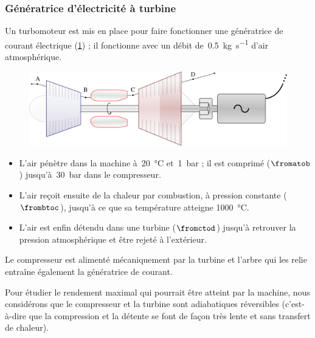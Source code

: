 \subsubsection{Génératrice d’électricité à turbine}
\label{exo_generatrice_electricite_turbine}

	Un turbomoteur est mis en place pour faire fonctionner une génératrice de courant électrique (\cref{fig_exo_turbomoteur}) ; il fonctionne avec un débit de~\SI{0,5}{\kilogram\per\second} d’air atmosphérique.
	
	\begin{figure}
		\begin{center}
		\includegraphics[width=\textwidth]{images/turbomoteur_generatrice.png}
		\end{center}
		\label{fig_exo_turbomoteur}
	\end{figure}
		
	\begin{itemize}
		\item L’air pénètre dans la machine à~\SI{20}{\degreeCelsius} et~\SI{1}{\bar} ; il est comprimé ($\fromatob$) jusqu’à~\SI{30}{\bar} dans le compresseur.	
		\item L’air reçoit ensuite de la chaleur par combustion, à pression constante ($\frombtoc$), jusqu’à ce que sa température atteigne \SI{1000}{\degreeCelsius}.	
		\item L’air est enfin détendu dans une turbine ($\fromctod$) jusqu’à retrouver la pression atmosphérique et être rejeté à l’extérieur.
	\end{itemize}
	
	Le compresseur est alimenté mécaniquement par la turbine et l’arbre qui les relie entraîne également la génératrice de courant.
	
	Pour étudier le rendement maximal qui pourrait être atteint par la machine, nous considérons que le compresseur et la turbine sont adiabatiques réversibles (c’est-à-dire que la compression et la détente se font de façon très lente et sans transfert de chaleur).

